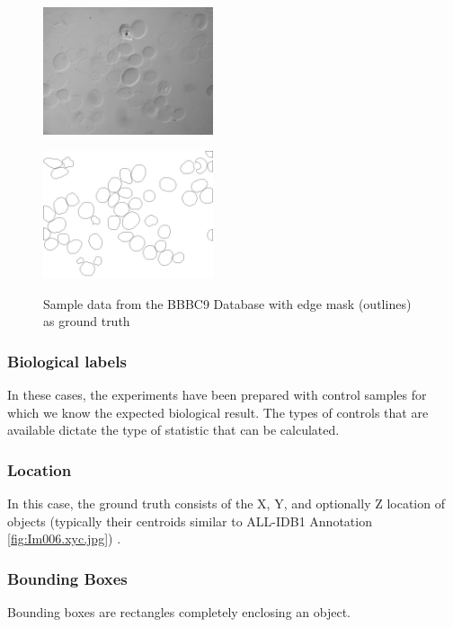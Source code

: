 \begin{figure}[H]
\begin{minipage}[c]{0.4\linewidth}
\centering
\includegraphics[width=50mm]{../images/48hr-001-DIC.jpg}
\label{fig:BBBC009_img}
\end{minipage}
\hfill
\begin{minipage}[c]{0.4\linewidth}
\centering
\includegraphics[width=50mm]{../images/48hr-001-DIC_.jpg}
\label{fig:BBBC009_O}
\end{minipage}
\caption{Sample data from the BBBC9 Database with edge mask (outlines) as ground truth}
\end{figure}

\subsubsection{Biological labels}
\hspace{\parindent}
In these cases, the experiments have been prepared with control samples for which we know the expected biological result. The types of controls that are available dictate the type of statistic that can be calculated.

\subsubsection{Location}
\hspace{\parindent}
In this case, the ground truth consists of the X, Y, and optionally Z location of objects (typically their centroids similar to ALL-IDB1 Annotation \ref{fig:Im006.xyc.jpg}) .

\subsubsection{Bounding Boxes}
\hspace{\parindent}
Bounding boxes are rectangles completely enclosing an object.

